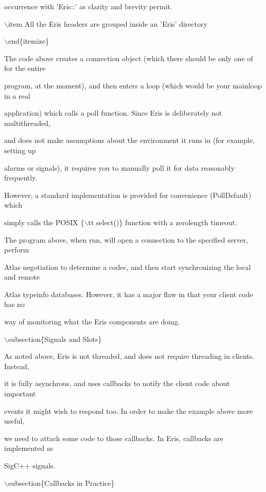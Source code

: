 \documentclass[12pt]{article}
\begin{document}
occurrence with 'Eris::' as clarity and brevity permit.

\ensuremath{\backslash}item All the Eris headers are grouped inside an 'Eris' directory 

\ensuremath{\backslash}end\{itemize\}



The code above creates a connection object (which there should be only one of for the entire

program, at the moment), and then enters a loop (which would be your mainloop in a real

application) which calls a poll function. Since Eris is deliberately not multithreaded,

and does not make assumptions about the environment it runs in (for example, setting up

alarms or signals), it requires you to manually poll it for data reasonably frequently.

However, a standard implementation is provided for convenience (PollDefault) which

simply calls the POSIX \{\ensuremath{\backslash}tt select()\} function with a zerolength timeout.



The program above, when run, will open a connection to the specified server, perform

Atlas negotiation to determine a codec, and then start synchronizing the local and remote

Atlas typeinfo databases. However, it has a major flaw in that your client code has no

way of monitoring what the Eris components are doing.



\ensuremath{\backslash}subsection\{Signals and Slots\}



As noted above, Eris is not threaded, and does not require threading in clients. Instead,

it is fully asynchrous, and uses callbacks to notify the client code about important

events it might wish to respond too. In order to make the example above more useful,

we need to attach some code to those callbacks. In Eris, callbacks are implemented as

SigC++ signals.



\ensuremath{\backslash}subsection\{Callbacks in Practice\}
\end{document}
